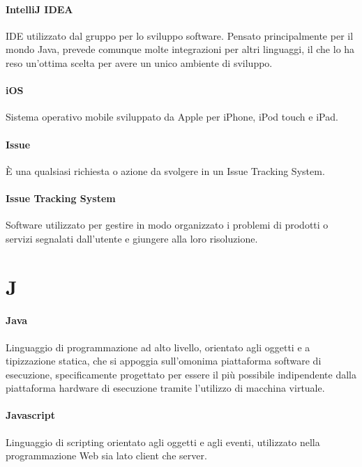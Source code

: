 \documentclass[]{article}
\begin{document}
	\paragraph*{IntelliJ IDEA}
	IDE utilizzato dal gruppo per lo sviluppo software. Pensato principalmente per il mondo Java, prevede comunque molte integrazioni per altri linguaggi, il che lo ha reso un'ottima scelta per avere un unico ambiente di sviluppo.

	\paragraph*{iOS}
	Sistema operativo mobile sviluppato da Apple per iPhone, iPod touch e iPad.

	\paragraph*{Issue}
	È una qualsiasi richiesta o azione da svolgere in un Issue Tracking System.

	\paragraph*{Issue Tracking System}
	Software utilizzato per gestire in modo organizzato i problemi di prodotti o servizi segnalati dall’utente e giungere alla loro risoluzione.

	\newpage

	\section*{J}

	\paragraph*{Java}
	Linguaggio di programmazione ad alto livello, orientato agli oggetti e a tipizzazione statica, che si appoggia sull'omonima piattaforma software di esecuzione, specificamente progettato per essere il più possibile indipendente dalla piattaforma hardware di esecuzione tramite l'utilizzo di macchina virtuale.

	\paragraph*{Javascript}
	Linguaggio di scripting orientato agli oggetti e agli eventi, utilizzato nella programmazione Web sia lato client che server.
\end{document}
